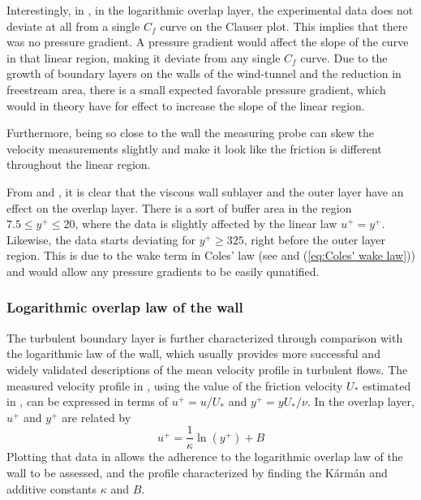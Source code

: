 \documentclass{article}
\begin{document}
Interestingly, in , in the logarithmic overlap layer, the experimental data does not deviate at all from a single $C_f$ curve on the Clauser plot. This implies that there was no pressure gradient. A pressure gradient would affect the slope of the curve in that linear region, making it deviate from any single $C_f$ curve. Due to the growth of boundary layers on the walls of the wind-tunnel and the reduction in freestream area, there is a small expected favorable pressure gradient, which would in theory have for effect to increase the slope of the linear region.

Furthermore, being so close to the wall the measuring probe can skew the velocity measurements slightly and make it look like the friction is different throughout the linear region.

From  and , it is clear that the viscous wall sublayer and the outer layer have an effect on the overlap layer. There is a sort of buffer area in the region $ 7.5 \le y^+ \le 20$, where the data is slightly affected by the linear law $u^+=y^+$. Likewise, the data starts deviating for $y^+ \ge 325$, right before the outer layer region. This is due to the wake term in Coles' law (see  and (\ref{eq:Coles' wake law})) and would allow any pressure gradients to be easily qunatified.

\subsubsection{Logarithmic overlap law of the wall}
\label{sec: log law}

The turbulent boundary layer is further characterized through comparison with the logarithmic law of the wall, which usually provides more successful and widely validated descriptions of the mean velocity profile in turbulent flows. The measured velocity profile in , using the value of the friction velocity $U_*$ estimated in , can be expressed in terms of $u^+ = u/U_*$ and $y^+ = y U_* / \nu$. In the overlap layer, $u^+$ and $y^+$ are related by 
\begin{equation}
    u^+ = \frac{1}{\kappa}\ln(y^+) + B
    \label{eq:log law}
\end{equation}
Plotting that data in  allows the adherence to the logarithmic overlap law of the wall to be assessed, and the profile characterized by finding the K\'arm\'an and additive constants $\kappa$ and $B$.
\end{document}
